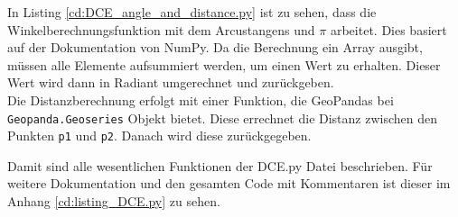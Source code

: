 {	In Listing \ref{cd:DCE_angle_and_distance.py} ist zu sehen, dass die Winkelberechnungsfunktion mit dem Arcustangens und $\pi$ arbeitet. Dies basiert auf der Dokumentation von NumPy. Da die Berechnung ein Array ausgibt, müssen alle Elemente aufsummiert werden, um einen Wert zu erhalten. Dieser Wert wird dann in Radiant umgerechnet und zurückgeben. \\
	Die Distanzberechnung erfolgt mit einer Funktion, die GeoPandas bei \lstinline|Geopanda.Geoseries| Objekt bietet. Diese errechnet die Distanz zwischen den Punkten \lstinline|p1| und \lstinline|p2|. Danach wird diese zurückgegeben.
	

	Damit sind alle wesentlichen Funktionen der DCE.py Datei beschrieben. Für weitere Dokumentation und den gesamten Code mit Kommentaren ist dieser im Anhang \ref{cd:listing_DCE.py} zu sehen.
}


